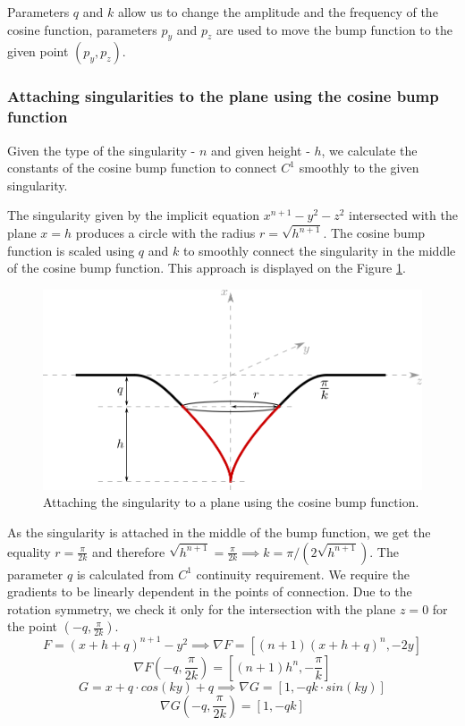 Parameters $q$ and $k$ allow us to change the amplitude and the frequency of
the cosine function, parameters $p_y$ and $p_z$ are used to move the bump function
to the given point $(p_y, p_z)$.

\subsubsection*{Attaching singularities to the plane using the cosine bump function}

Given the type of the singularity - $n$ and given height - $h$, we calculate the
constants of the cosine bump function to connect $C^1$ smoothly to the given
singularity.

The singularity given by the implicit equation $x^{n+1}-y^2-z^2$ intersected with 
the plane $x=h$ produces a circle with the radius $r=\sqrt{h^{n+1}}$.
The cosine bump function is scaled using $q$ and $k$ to smoothly connect the
singularity in the middle of the cosine bump function. This approach is displayed
on the Figure \ref{img:25}. 

\begin{figure}
    \centerline{\includegraphics[scale=0.5]{images/img25}}
    \caption[Attaching the singularity to a plane using the cosine bump function]
    {Attaching the singularity to a plane using the cosine bump function.}
    \label{img:25}
\end{figure}

As the singularity is attached in the middle of the
bump function, we get the equality $r=\frac{\pi}{2k}$ and therefore
$\sqrt{h^{n+1}}=\frac{\pi}{2k} \implies k=\pi/(2\sqrt{h^{n+1}})$.
The parameter $q$ is calculated from $C^1$ continuity requirement. We require the
gradients to be linearly dependent in the points of connection. Due to the rotation
symmetry, we check it only for the intersection with the plane $z=0$
for the point $(-q, \frac{\pi}{2k})$.
$$F=(x+h+q)^{n+1}-y^2 \implies \nabla F = \left[(n+1)(x+h+q)^n, -2y\right]$$
$$\nabla F \left(-q, \frac{\pi}{2k}\right) = \left[(n+1) h^n, -\frac{\pi}{k}\right]$$
$$G=x+q \cdot cos(k y)+q \implies \nabla G = \left[1, -qk \cdot sin(k y)\right]$$
$$\nabla G \left(-q, \frac{\pi}{2k}\right) = \left[1, -qk \right]$$

